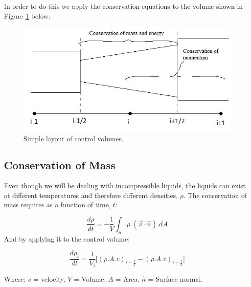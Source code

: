 \documentclass[11pt,letterpaper,titlepage]{article}
\newcommand{\half}{\frac{1}{2}}
\begin{document}
\vspace{0.25cm}
\noindent
In order to do this we apply the conservation equations to the volume shown in Figure \ref{figure:ZZZ_ControlVolume} below:
	\begin{center}
		\begin{minipage}[c]{0.7\textwidth}
	
			\begin{figure}[H]
			
				\includegraphics[width=5in]{ZZZ_ControlVolume.png}
				\caption{Simple layout of control volumes.}
				\label{figure:ZZZ_ControlVolume}
			\end{figure}
		\end{minipage}
	\end{center}
\vspace{0.5cm}

\newpage
\subsection{Conservation of Mass}
Even though we will be dealing with incompressible liquids, the liquids can exist at different temperatures and therefore different densities, $\rho$. The conservation of mass requires as a function of time, $t$:

\begin{equation*}
\frac{d\rho}{dt}=-\frac{1}{V}\int_S \rho.(\vec{v}\cdot \hat{n}).dA
\end{equation*}
\newline
\noindent And by applying it to the control volume:

\begin{equation}
\frac{d\rho_i}{dt} = \frac{1}{V_i}\biggr[ (\rho.A.v)_{i-\half}-(\rho.A.v)_{i+\half} \biggr]
\end{equation}

\noindent 
Where: 
\newline \noindent $v$ \quad = velocity.
\newline \noindent $V$ \quad = Volume.
\newline \noindent $A$ \quad = Area.
\newline \noindent $\hat{n}$ \quad = Surface normal.
\end{document}
